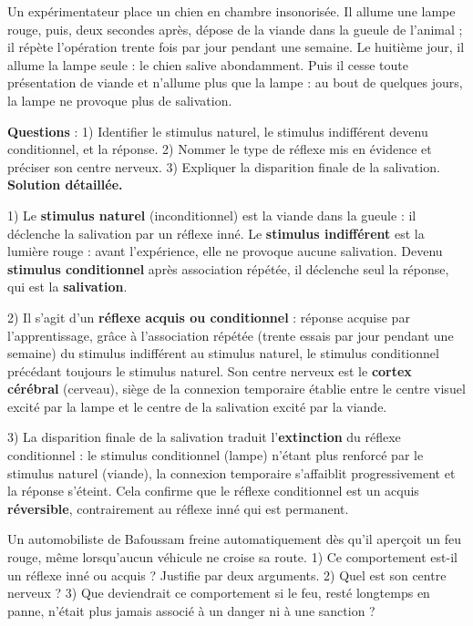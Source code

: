 \documentclass[11pt]{article}
\begin{document}
\begin{exoresolu}
Un expérimentateur place un chien en chambre insonorisée. Il allume une lampe rouge, puis, deux secondes après, dépose de la viande dans la gueule de l'animal ; il répète l'opération trente fois par jour pendant une semaine. Le huitième jour, il allume la lampe seule : le chien salive abondamment. Puis il cesse toute présentation de viande et n'allume plus que la lampe : au bout de quelques jours, la lampe ne provoque plus de salivation.\par
\textbf{Questions} : 1) Identifier le stimulus naturel, le stimulus indifférent devenu conditionnel, et la réponse. 2) Nommer le type de réflexe mis en évidence et préciser son centre nerveux. 3) Expliquer la disparition finale de la salivation.
\tcblower
\textbf{Solution détaillée.}\par
1) Le \textbf{stimulus naturel} (inconditionnel) est la viande dans la gueule : il déclenche la salivation par un réflexe inné. Le \textbf{stimulus indifférent} est la lumière rouge : avant l'expérience, elle ne provoque aucune salivation. Devenu \textbf{stimulus conditionnel} après association répétée, il déclenche seul la réponse, qui est la \textbf{salivation}.\par
2) Il s'agit d'un \textbf{réflexe acquis ou conditionnel} : réponse acquise par l'apprentissage, grâce à l'association répétée (trente essais par jour pendant une semaine) du stimulus indifférent au stimulus naturel, le stimulus conditionnel précédant toujours le stimulus naturel. Son centre nerveux est le \textbf{cortex cérébral} (cerveau), siège de la connexion temporaire établie entre le centre visuel excité par la lampe et le centre de la salivation excité par la viande.\par
3) La disparition finale de la salivation traduit l'\textbf{extinction} du réflexe conditionnel : le stimulus conditionnel (lampe) n'étant plus renforcé par le stimulus naturel (viande), la connexion temporaire s'affaiblit progressivement et la réponse s'éteint. Cela confirme que le réflexe conditionnel est un acquis \textbf{réversible}, contrairement au réflexe inné qui est permanent.
\end{exoresolu}

\begin{exercice}
Un automobiliste de Bafoussam freine automatiquement dès qu'il aperçoit un feu rouge, même lorsqu'aucun véhicule ne croise sa route. 1) Ce comportement est-il un réflexe inné ou acquis ? Justifie par deux arguments. 2) Quel est son centre nerveux ? 3) Que deviendrait ce comportement si le feu, resté longtemps en panne, n'était plus jamais associé à un danger ni à une sanction ?
\end{exercice}
\end{document}
